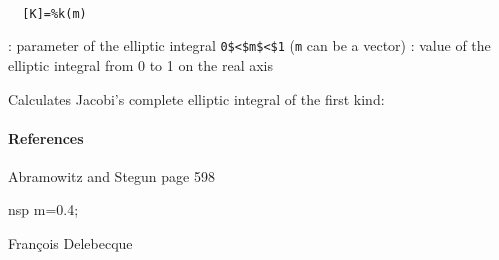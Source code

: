 
\begin{mandesc}
   \\ %
\end{mandesc}
\begin{calling_sequence}
\begin{verbatim}
  [K]=%k(m)  
\end{verbatim}
\end{calling_sequence}
\begin{parameters}
  \begin{varlist}
    : parameter of the elliptic integral \verb!0$<$m$<$1! (\verb!m! can be a vector)
    : value of the elliptic integral from 0 to 1 on the real axis
  \end{varlist}
\end{parameters}
\begin{mandescription}
  Calculates Jacobi's complete elliptic integral
  of the first kind:
\end{mandescription}
\paragraph{References}
Abramowitz and Stegun page 598
\begin{examples}
  \begin{mintednsp}{nsp}
    m=0.4;
  \end{mintednsp}
\end{examples}
\begin{manseealso}
\end{manseealso}
\begin{authors}
  Fran\c{c}ois Delebecque  
\end{authors}
